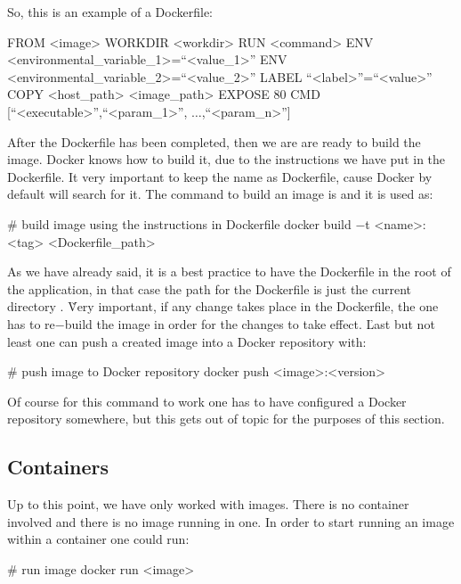 So, this is an example of a Dockerfile:

\begin{block}
FROM <image>
WORKDIR <workdir>
RUN <command>
ENV <environmental_variable_1>=``<value_1>''
ENV <environmental_variable_2>=``<value_2>''
LABEL ``<label>''=``<value>''
COPY <host_path> <image_path>
EXPOSE 80
CMD [``<executable>'',``<param_1>'', $\ldots$,``<param_n>'']
\end{block}

After the Dockerfile has been completed, then we are are ready to build the image. Docker knows how to build it, due
to the instructions we have put in the Dockerfile. It very important to keep the name as Dockerfile, cause Docker by
default will search for it. The command to build an image is  and it is used as:

\begin{bash}
# build image using the instructions in Dockerfile
docker build $-$t <name>:<tag> <Dockerfile_path>
\end{bash}

As we have already said, it is a best practice to have the Dockerfile in the root of the application, in that case
the path for the Dockerfile is just the current directory . \v

Very important, if any change takes place in the Dockerfile, the one has to re$-$build the image in order for the
changes to take effect. \v

Last but not least one can push a created image into a Docker repository with:

\begin{bash}
# push image to Docker repository
docker push <image>:<version>
\end{bash}

Of course for this command to work one has to have configured a Docker repository somewhere, but this gets out of
topic for the purposes of this section.

\subsection{Containers}

Up to this point, we have only worked with images. There is no container involved and there is no image running in
one. In order to start running an image within a container one could run:

\begin{bash}
# run image
docker run <image>
\end{bash}

